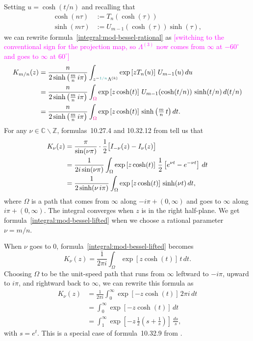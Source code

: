 \documentclass{article}
\theoremstyle{plain}
\newcommand{\Z}{\mathbb{Z}}
\newcommand{\C}{\mathbb{C}}
\begin{document}
Setting $u = \cosh(t/n)$ and recalling that
\begin{align*}
\cosh(n\tau) & := T_n(\cosh(\tau)) \\
\sinh(m\tau) & := U_{m-1}(\cosh(\tau)) \sinh(\tau),
\end{align*}
we can rewrite formula~\ref{integral:mod-bessel-rational} as \textcolor{magenta}{[switching to the conventional sign for the projection map, so $\Lambda^{(3)}$ now comes from $\infty$ at $-60^\circ$ and goes to $\infty$ at $60^\circ$]}
\begin{align}
\notag K_{m/n}(z) & = \frac{n}{2 \sinh\big(\tfrac{m}{n}\,i\pi\big)} \int_{z^{-\textcolor{DarkCyan}{1/n}}\Lambda^{(k)}} \exp\left[z T_n(u)\right]\,U_{m-1}(u)\,du \\
\notag & = \frac{n}{2 \sinh\big(\tfrac{m}{n}\,i\pi\big)} \int_{\textcolor{magenta}{\Omega}} \exp\left[z \cosh(t)\right]\,U_{m-1}(\cosh(t/n))\,\sinh(t/n)\,d(t/n) \\
\label{integral:mod-bessel-lifted} & = \frac{n}{2 \sinh\big(\tfrac{m}{n}\,i\pi\big)} \int_{\textcolor{magenta}{\Omega}} \exp\left[z \cosh(t)\right]\,\sinh\big(\tfrac{m}{n}\,t\big)\,dt.
\end{align}
For any $\nu \in \C \smallsetminus \Z$, formulas~10.27.4 and 10.32.12 from \cite{dlmf} tell us that
\begin{align}
\notag K_\nu(z) & = \frac{\pi}{\sin(\nu \pi)} \cdot \frac{1}{2}\big[ I_{-\nu}(z) - I_\nu(z) \big] \\
\notag & = \frac{1}{2i \sin(\nu \pi)} \int_\Omega \exp\left[z \cosh(t)\right]\,\frac{1}{2}\left[e^{\nu t} - e^{-\nu t}\right]\,dt \\
\label{intgral:mod-bessel-general} & = \frac{1}{2 \sinh(\nu\,i\pi)} \int_\Omega \exp\left[z \cosh(t)\right]\,\sinh(\nu t)\,dt,
\end{align}
where $\Omega$ is a path that comes from $\infty$ along $-i \pi + (0, \infty)$ and goes to $\infty$ along $i \pi + (0, \infty)$. The integral converges when $z$ is in the right half-plane. We get formula~\ref{integral:mod-bessel-lifted} when we choose a rational parameter $\nu = m/n$.

When $\nu$ goes to $0$, formula~\ref{integral:mod-bessel-lifted} becomes
\[ K_\nu(z) = \frac{1}{2\pi i} \int_\Omega \exp\left[z \cosh(t)\right]\,t\,dt. \]
Choosing $\Omega$ to be the unit-speed path that runs from $\infty$ leftward to $-i\pi$, upward to $i\pi$, and rightward back to $\infty$, we can rewrite this formula as
\begin{align*}
K_\nu(z) & = \frac{1}{2\pi i} \int_0^\infty \exp\left[-z \cosh(t)\right]\,2\pi i\,dt \\
& = \int_0^\infty \exp\left[-z \cosh(t)\right]\,dt \\
& = \int_1^\infty \exp\left[-z\,\tfrac{1}{2}\left(s + \tfrac{1}{s}\right)\right]\,\frac{ds}{s},
\end{align*}
with $s = e^t$. This is a special case of formula~10.32.9 from \cite{dlmf}.
\end{document}
